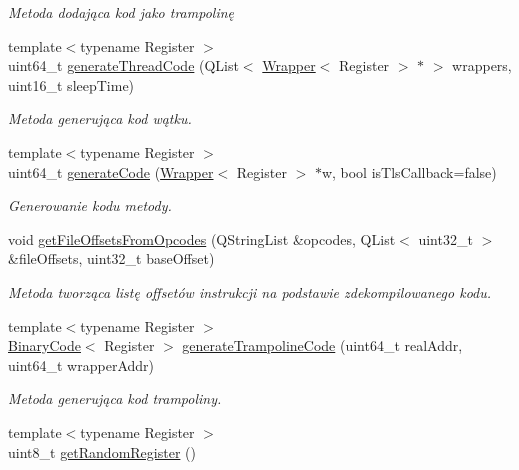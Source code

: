 \begin{DoxyCompactItemize}
\begin{DoxyCompactList}\small\item\em Metoda dodająca kod jako trampolinę \end{DoxyCompactList}\item 
{\footnotesize template$<$typename Register $>$ }\\uint64\-\_\-t \hyperlink{class_p_e_adding_methods_a5ea4a8e2b325176f2fbf6e4f90c56f9c}{generate\-Thread\-Code} (Q\-List$<$ \hyperlink{class_d_adding_methods_1_1_wrapper}{Wrapper}$<$ Register $>$ $\ast$ $>$ wrappers, uint16\-\_\-t sleep\-Time)
\begin{DoxyCompactList}\small\item\em Metoda generująca kod wątku. \end{DoxyCompactList}\item 
{\footnotesize template$<$typename Register $>$ }\\uint64\-\_\-t \hyperlink{class_p_e_adding_methods_a85b7bf24809fee317810bcf1e8277bbf}{generate\-Code} (\hyperlink{class_d_adding_methods_1_1_wrapper}{Wrapper}$<$ Register $>$ $\ast$w, bool is\-Tls\-Callback=false)
\begin{DoxyCompactList}\small\item\em Generowanie kodu metody. \end{DoxyCompactList}\item 
void \hyperlink{class_p_e_adding_methods_aa009e39ea9cdd8976930b3d9ade337e1}{get\-File\-Offsets\-From\-Opcodes} (Q\-String\-List \&opcodes, Q\-List$<$ uint32\-\_\-t $>$ \&file\-Offsets, uint32\-\_\-t base\-Offset)
\begin{DoxyCompactList}\small\item\em Metoda tworząca listę offsetów instrukcji na podstawie zdekompilowanego kodu. \end{DoxyCompactList}\item 
{\footnotesize template$<$typename Register $>$ }\\\hyperlink{class_binary_code}{Binary\-Code}$<$ Register $>$ \hyperlink{class_p_e_adding_methods_a5a216258dd2373a007522b6f0b7be418}{generate\-Trampoline\-Code} (uint64\-\_\-t real\-Addr, uint64\-\_\-t wrapper\-Addr)
\begin{DoxyCompactList}\small\item\em Metoda generująca kod trampoliny. \end{DoxyCompactList}\item 
{\footnotesize template$<$typename Register $>$ }\\uint8\-\_\-t \hyperlink{class_p_e_adding_methods_af180fc5ca237dda8df7d4e286e164c16}{get\-Random\-Register} ()

\end{DoxyCompactItemize}
